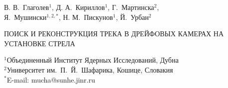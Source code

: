 
\thispagestyle{empty} \setcounter{page}{0}

\vspace*{8cm} \noindent
{\large
  В. В.~Глаголев$^{1}$, Д. А.~Кириллов${^1}$, Г.~Мартинска$^{2}$,\\
  Я.~Мушински$^{1,2,*}$, Н. М.~Пискунов$^{1}$, Й.~Урбан$^{2}$
}

\vspace{2cm} \noindent
{\large
  ПОИСК И РЕКОНСТРУКЦИЯ ТРЕКА В ДРЕЙФОВЫХ КАМЕРАХ НА УСТАНОВКЕ СТРЕЛА
}

\vspace{4cm} \noindent
{\small
  $^{1}$Объединенный Институт Ядерных Исследований, Дубна\\
  $^{2}$Университет им.~П.~Й.~Шафарика, Кошице, Словакия\\
  $^{*}$E-mail: mucha@sunhe.jinr.ru
}



